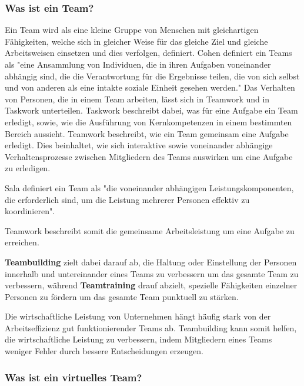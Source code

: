 \documentclass[a4paper,11pt]{article}%
\renewcommand{\\}{\vspace*{0.5\baselineskip} \newline}
\begin{document}
\subsubsection{Was ist ein Team?}
\label{team}
	Ein Team wird als eine kleine Gruppe von Menschen mit gleichartigen Fähigkeiten, welche sich in gleicher Weise für das gleiche Ziel und gleiche Arbeitsweisen einsetzen und dies verfolgen, definiert.\citep[p.2]{zenun2007effects} \newline
Cohen \citep[p.557]{cohen1997makes} definiert ein Teams als "eine Ansammlung von Individuen, die in ihren Aufgaben voneinander abhängig sind, die die Verantwortung für die Ergebnisse teilen, die von sich selbst und von anderen als eine intakte soziale Einheit gesehen werden."
Das Verhalten von Personen, die in einem Team arbeiten, lässt sich in \glqq Teamwork \grqq und in \glqq Taskwork \grqq unterteilen. \citep[p. 541-542]{rousseau2006teamwork}
Taskwork beschreibt dabei, was für eine Aufgabe ein Team erledigt, sowie, wie die Ausführung von Kernkompetenzen in einem bestimmten Bereich aussieht. 
Teamwork beschreibt, wie ein Team gemeinsam eine Aufgabe erledigt. Dies beinhaltet, wie sich interaktive sowie voneinander abhängige Verhaltensprozesse zwischen Mitgliedern des Teams auswirken um eine Aufgabe zu erledigen. \citep[p. 357]{marks2001temporally} 

Sala \citep[p.541]{salas2008teams} definiert ein Team als "die voneinander abhängigen Leistungskomponenten, die erforderlich sind, um die Leistung mehrerer Personen effektiv zu koordinieren".

Teamwork beschreibt somit die gemeinsame Arbeitsleistung um eine Aufgabe zu erreichen.

\textbf{Teambuilding} zielt dabei darauf ab, die Haltung oder Einstellung der Personen innerhalb und untereinander eines Teams zu verbessern um das gesamte Team zu verbessern, während \textbf{Teamtraining} drauf abzielt, spezielle Fähigkeiten einzelner Personen zu fördern um das gesamte Team punktuell zu stärken. \citep[p. 367-369]{shuffler2011there}\
		
Die wirtschaftliche Leistung von Unternehmen hängt häufig stark von der Arbeitseffizienz gut funktionierender Teams ab. Teambuilding kann somit helfen, die wirtschaftliche Leistung zu verbessern, indem Mitgliedern eines Teams weniger Fehler durch bessere Entscheidungen erzeugen. \citep[p. 1-6]{biech2007pfeiffer} 

\subsubsection{Was ist ein virtuelles Team?}
\label{vts}
\end{document}
